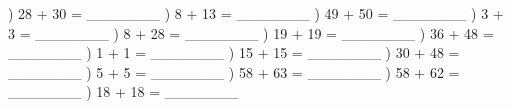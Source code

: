 \documentclass{article}%
\begin{document}
\newline%
\newline%
) 28 + 30 = \_\_\_\_\_\_\_%
\newline%
\newline%
) 8 + 13 = \_\_\_\_\_\_\_%
\newline%
\newline%
) 49 + 50 = \_\_\_\_\_\_\_%
\newline%
\newline%
) 3 + 3 = \_\_\_\_\_\_\_%
\newline%
\newline%
) 8 + 28 = \_\_\_\_\_\_\_%
\newline%
\newline%
) 19 + 19 = \_\_\_\_\_\_\_%
\newline%
\newline%
) 36 + 48 = \_\_\_\_\_\_\_%
\newline%
\newline%
) 1 + 1 = \_\_\_\_\_\_\_%
\newline%
\newline%
) 15 + 15 = \_\_\_\_\_\_\_%
\newline%
\newline%
) 30 + 48 = \_\_\_\_\_\_\_%
\newline%
\newline%
) 5 + 5 = \_\_\_\_\_\_\_%
\newline%
\newline%
) 58 + 63 = \_\_\_\_\_\_\_%
\newline%
\newline%
) 58 + 62 = \_\_\_\_\_\_\_%
\newline%
\newline%
) 18 + 18 = \_\_\_\_\_\_\_%
\newline%
\newline%
\end{document}

